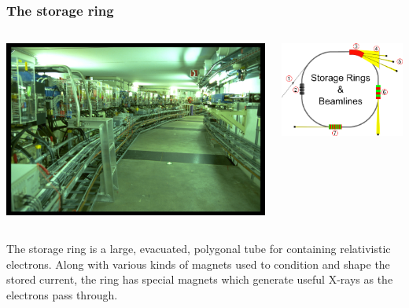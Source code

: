 \documentclass[10pt, xcolor=x11names, compress]{beamer}
\begin{document}
\begin{frame}
  \frametitle{The storage ring}
  \begin{columns}
    \begin{column}{0.55\linewidth}
      \begin{center}
        \includegraphics[width=0.9\linewidth]{synch/SLSstorage.jpg}
      \end{center}
    \end{column}
    \begin{column}{0.45\linewidth}
      \begin{center}
        \includegraphics[width=0.9\linewidth]{synch/storage.png}
      \end{center}
    \end{column}
  \end{columns}

  \medskip

  The storage ring is a large, evacuated, \alert{polygonal}
  tube for containing relativistic electrons.  Along with various
  kinds of magnets used to condition and shape the stored current, the
  ring has special magnets which generate useful X-rays as the
  electrons pass through.


\end{frame}
\end{document}
